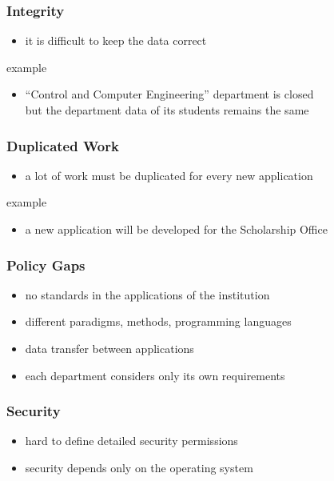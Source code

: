\documentclass[dvipsnames]{beamer}
\theoremstyle{plain}
\begin{document}
\begin{frame}
  \frametitle{Integrity}

  \begin{itemize}
    \item it is difficult to keep the data correct
  \end{itemize}

  \medskip
  \begin{exampleblock}{example}
    \begin{itemize}
      \item ``Control and Computer Engineering'' department is closed\\
        but the department data of its students remains the same
    \end{itemize}
  \end{exampleblock}
\end{frame}

\begin{frame}
  \frametitle{Duplicated Work}

  \begin{itemize}
    \item a lot of work must be duplicated for every new application
  \end{itemize}

  \medskip
  \begin{exampleblock}{example}
    \begin{itemize}
      \item a new application will be developed for the Scholarship Office
    \end{itemize}
  \end{exampleblock}
\end{frame}

\begin{frame}
  \frametitle{Policy Gaps}

  \begin{itemize}
    \item no standards in the applications of the institution
    \item different paradigms, methods, programming languages
    \item data transfer between applications

    \pause
    \medskip
    \item each department considers only its own requirements
  \end{itemize}
\end{frame}

\begin{frame}
  \frametitle{Security}

  \begin{itemize}
    \item hard to define detailed security permissions
    \item security depends only on the operating system
  \end{itemize}
\end{frame}
\end{document}
